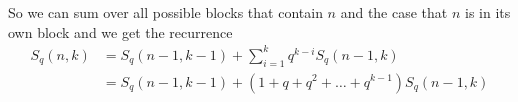 \documentclass[12pt]{amsart}
\theoremstyle{definition}
\begin{document}
\begin{itemize}
So we can sum over all possible blocks that contain $n$ and the case that $n$ is in its own block and we get the recurrence 
\begin{align*}
S_q(n,k)&=S_q(n-1,k-1)+\sum_{i=1}^k q^{k-i}S_q(n-1,k)\\
&=S_q(n-1,k-1)+(1+q+q^2+\dots+q^{k-1})S_q(n-1,k)
\end{align*}


\end{itemize}
\end{document}
